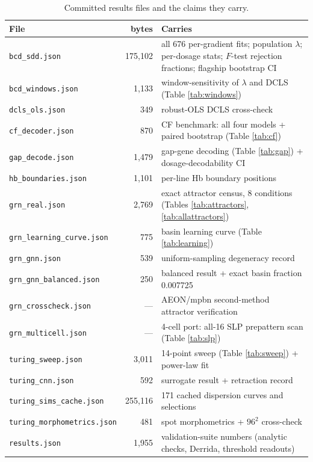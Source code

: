 \begin{table}[!htbp]
\centering
\caption{Committed results files and the claims they carry.}
\small
\begin{tabular}{lrp{7cm}}
\toprule
File & bytes & Carries \\
\midrule
\texttt{bcd\_sdd.json} & 175{,}102 & all 676 per-gradient fits; population
$\lambda$; per-dosage stats; $F$-test rejection fractions; flagship bootstrap
CI \\
\texttt{bcd\_windows.json} & 1{,}133 & window-sensitivity of $\lambda$ and
DCLS (Table \ref{tab:windows}) \\
\texttt{dcls\_ols.json} & 349 & robust-OLS DCLS cross-check \\
\texttt{cf\_decoder.json} & 870 & CF benchmark: all four models + paired
bootstrap (Table \ref{tab:cf}) \\
\texttt{gap\_decode.json} & 1{,}479 & gap-gene decoding
(Table \ref{tab:gap}) + dosage-decodability CI \\
\texttt{hb\_boundaries.json} & 1{,}101 & per-line Hb boundary positions \\
\texttt{grn\_real.json} & 2{,}769 & exact attractor census, 8 conditions
(Tables \ref{tab:attractors}, \ref{tab:allattractors}) \\
\texttt{grn\_learning\_curve.json} & 775 & basin learning curve
(Table \ref{tab:learning}) \\
\texttt{grn\_gnn.json} & 539 & uniform-sampling degeneracy record \\
\texttt{grn\_gnn\_balanced.json} & 250 & balanced result + exact basin
fraction 0.007725 \\
\texttt{grn\_crosscheck.json} & --- & AEON/mpbn second-method attractor
verification \\
\texttt{grn\_multicell.json} & --- & 4-cell port: all-16 SLP prepattern
scan (Table \ref{tab:slp}) \\
\texttt{turing\_sweep.json} & 3{,}011 & 14-point sweep
(Table \ref{tab:sweep}) + power-law fit \\
\texttt{turing\_cnn.json} & 592 & surrogate result + retraction record \\
\texttt{turing\_sims\_cache.json} & 255{,}116 & 171 cached dispersion curves
and selections \\
\texttt{turing\_morphometrics.json} & 481 & spot morphometrics +
$96^2$ cross-check \\
\texttt{results.json} & 1{,}955 & validation-suite numbers (analytic checks,
Derrida, threshold readouts) \\
\bottomrule
\end{tabular}
\end{table}

